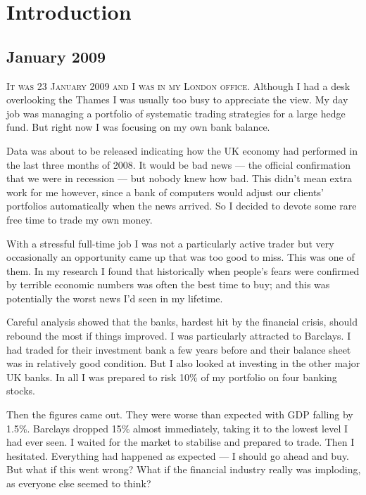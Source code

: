 \chapter*{Introduction}  {} 

\section*{January 2009}  {}

\noindent\textsc{It was 23 January 2009 and I was in my London office.} Although I had a desk overlooking the Thames I was usually too busy to appreciate the view. My day job was managing a portfolio of systematic trading strategies for a large hedge fund. But right now I was focusing on my own bank balance.

Data was about to be released indicating how the UK economy had performed in the last three months of 2008. It would be bad news --- the official confirmation that we were in recession --- but nobody knew how bad. This didn't mean extra work for me however, since a bank of computers would adjust our clients' portfolios automatically when the news arrived. So I decided to devote some rare free time to trade my own money.

With a stressful full-time job I was not a particularly active trader but very occasionally an opportunity came up that was too good to miss. This was one of them. In my research I found that historically when people's fears were confirmed by terrible economic numbers was often the best time to buy; and this was potentially the worst news I'd seen in my lifetime.

Careful analysis showed that the banks, hardest hit by the financial crisis, should rebound the most if things improved. I was particularly attracted to Barclays. I had traded for their investment bank a few years before and their balance sheet was in relatively good condition. But I also looked at investing in the other major UK banks. In all I was prepared to risk 10\% of my portfolio on four banking stocks.

Then the figures came out. They were worse than expected with GDP falling by 1.5\%. Barclays dropped 15\% almost immediately, taking it to the lowest level I had ever seen. I waited for the market to stabilise and prepared to trade. Then I hesitated. Everything had happened as expected --- I should go ahead and buy. But what if this went wrong? What if the financial industry really was imploding, as everyone else seemed to think?

